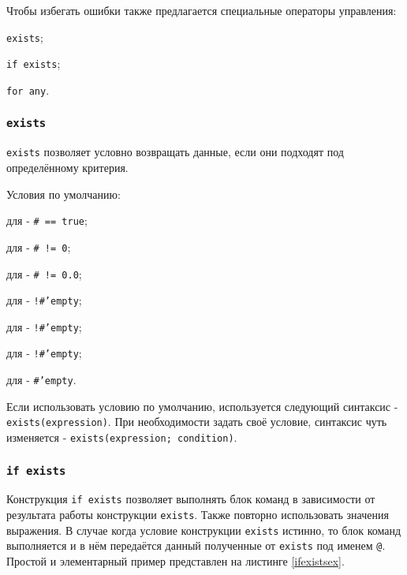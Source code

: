 Чтобы избегать ошибки также предлагается специальные операторы управления:
\begin{icItems}
	\item \texttt{exists};
	\item \texttt{if exists};
	\item \texttt{for any}.
\end{icItems}

\subsubsection{\texttt{exists}}

\texttt{exists} позволяет условно возвращать данные, если они подходят под определённому критерия.

Условия по умолчанию:
\begin{icItems}
	\item
	для \bool{} - \texttt{# == true};
	\item
	для \integer{} - \texttt{# != 0};
	\item
	для \double{} - \texttt{# != 0.0};
	\item
	для \str{} - \texttt{!#'empty};
	\item
	для \listtype{} - \texttt{!#'empty};
	\item
	для \set{} - \texttt{!#'empty};
	\item
	для \element{} - \texttt{#'empty}.
\end{icItems}

Если использовать условию по умолчанию, используется следующий синтаксис - \texttt{exists(expression)}.
При необходимости задать своё условие, синтаксис чуть изменяется - \texttt{exists(expression; condition)}.

\subsubsection{\texttt{if exists}}

Конструкция \texttt{if exists} позволяет выполнять блок команд в зависимости от результата работы конструкции \texttt{exists}. Также повторно использовать значения выражения. В случае когда условие конструкции \texttt{exists} истинно, то блок команд выполняется и в нём передаётся данный полученные от \texttt{exists} под именем \texttt{@}.
Простой и элементарный пример представлен на листинге \ref{ifexistsex}.


